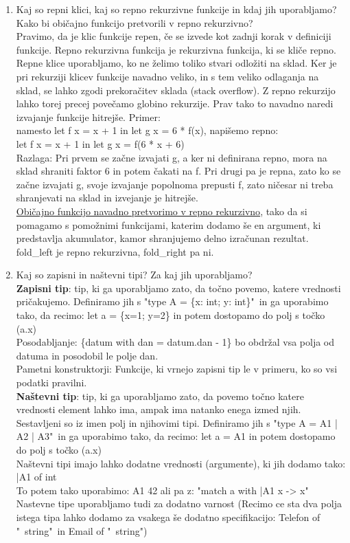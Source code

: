 \documentclass[a4paper]{article}
\begin{document}
\begin{enumerate}
        \item Kaj so repni klici, kaj so repno rekurzivne funkcije in kdaj jih uporabljamo? Kako bi običajno funkcijo pretvorili v repno rekurzivno?\\
        Pravimo, da je klic funkcije repen, če se izvede kot zadnji korak v definiciji funkcije. Repno rekurzivna funkcija je rekurzivna funkcija, ki se kliče repno. Repne klice uporabljamo, ko ne želimo toliko stvari odložiti na sklad. Ker je pri rekurziji klicev funkcije navadno veliko, in s tem veliko odlaganja na sklad, se lahko zgodi prekoračitev sklada (stack overflow). Z repno rekurzijo lahko torej precej povečamo globino rekurzije. Prav tako to navadno naredi izvajanje funkcije hitrejše. Primer:\\ namesto let f x = x + 1 in let g x = 6 * f(x), napišemo repno:\\ let f x = x + 1 in let g x = f(6 * x + 6)\\
        Razlaga: Pri prvem se začne izvajati g, a ker ni definirana repno, mora na sklad shraniti faktor 6 in potem čakati na f. Pri drugi pa je repna, zato ko se začne izvajati g, svoje izvajanje popolnoma prepusti f, zato ničesar ni treba shranjevati na sklad in izvejanje je hitrejše.\\
        \underline{Običajno funkcijo navadno pretvorimo v repno rekurzivno}, tako da si pomagamo s pomožnimi funkcijami, katerim dodamo še en argument, ki predstavlja akumulator, kamor shranjujemo delno izračunan rezultat.\\
        fold\_left je repno rekurzivna, fold\_right pa ni.
    
        \item Kaj so zapisni in naštevni tipi? Za kaj jih uporabljamo?\\
        \textbf{Zapisni tip}: tip, ki ga uporabljamo zato, da točno povemo, katere vrednosti pričakujemo. Definiramo jih s "type A = \{x: int; y: int\}"\ in ga uporabimo tako, da recimo: let a = \{x=1; y=2\} in potem dostopamo do polj s točko (a.x)\\
        Posodabljanje: \{datum with dan = datum.dan - 1\} bo obdržal vsa polja od datuma in posodobil le polje dan.\\
        Pametni konstruktorji: Funkcije, ki vrnejo zapisni tip le v primeru, ko so vsi podatki pravilni.\\
        \textbf{Naštevni tip}: tip, ki ga uporabljamo zato, da povemo točno katere vrednosti element lahko ima, ampak ima natanko enega izmed njih. Sestavljeni so iz imen polj in njihovimi tipi. Definiramo jih s "type A = A1 | A2 | A3"\ in ga uporabimo tako, da recimo: let a = A1 in potem dostopamo do polj s točko (a.x)\\
        Naštevni tipi imajo lahko dodatne vrednosti (argumente), ki jih dodamo tako: |A1 of int\\
        To potem tako uporabimo: A1 42 ali pa z: "match a with |A1 x -> x"\\
        Nastevne tipe uporabljamo tudi za dodatno varnost (Recimo ce sta dva polja istega tipa lahko dodamo za vsakega še dodatno specifikacijo: Telefon of "\ string"\ in Email of "\ string")
    

\end{enumerate}
\end{document}
